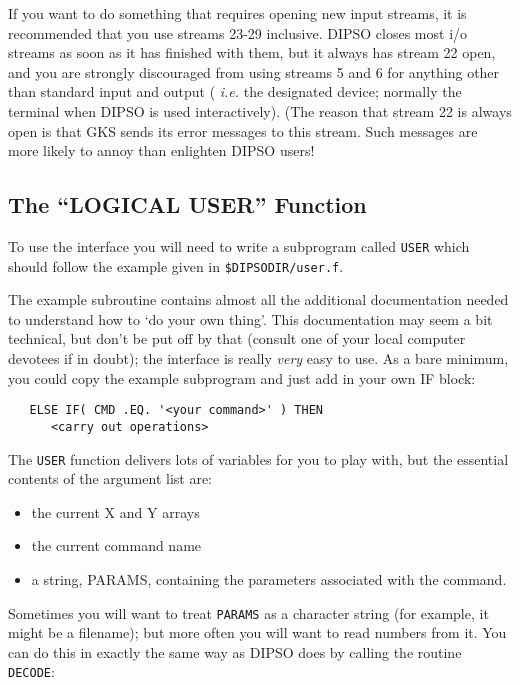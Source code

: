 \documentclass[twoside,11pt]{article}
\renewcommand{\_}{\texttt{\symbol{95}}}
\begin{document}
If you want to do something that requires opening new input streams,
it is recommended that you use streams 23-29 inclusive. DIPSO closes
most i/o streams as soon as it has finished with them, but it always
has stream 22 open, and you are strongly discouraged from using
streams 5 and 6 for anything other than standard input and output ({\em
i.e.} the designated device; normally the terminal when DIPSO is used
interactively). (The reason that stream 22 is always open is that GKS
sends its error messages to this stream. Such messages are more likely
to annoy than enlighten DIPSO users!

\subsection {The ``LOGICAL USER'' Function}

To use the interface you will need to write a subprogram called
{\tt{USER}}  which should follow the example given in {\tt{\$DIPSODIR/user.f}}. 

The example subroutine contains almost all the additional
documentation needed to understand how to `do your own thing'. This
documentation may seem a bit technical, but don't be put off by that
(consult one of your local computer devotees if in doubt); the
interface is really {\em very} easy to use. As a bare minimum, you
could copy the example subprogram and just add in your own IF block:

\begin{verbatim}
   ELSE IF( CMD .EQ. '<your command>' ) THEN
      <carry out operations>
\end{verbatim}

The {\tt{USER}}  function delivers lots of variables for you to play
with, but the essential contents of the argument list are:

\begin{itemize}
\item the current X and Y arrays
\item the current command name
\item a string, PARAMS, containing the parameters associated with the command.
\end{itemize}

Sometimes you will want to treat {\tt{PARAMS}}  as a character string (for
example, it might be a filename); but more often you will want to
read numbers from it. You can do this in exactly the same way as DIPSO
does by calling the routine {\tt{DECODE}}: 
\end{document}
